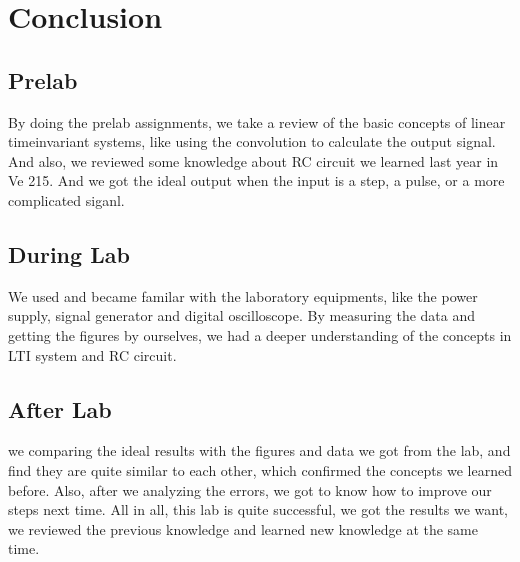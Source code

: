 \documentclass[12pt]{article}
\begin{document}
\section{Conclusion}
\subsection{Prelab}
By doing the prelab assignments, we take a review of the basic concepts of linear timeinvariant systems, like using the convolution to calculate the output signal. And also, we reviewed some knowledge about RC circuit we learned last year in Ve 215. And we got the ideal output when the input is a step, a pulse, or a more complicated siganl.
\subsection{During Lab}
We used and became familar with the laboratory equipments, like the power supply, signal generator and digital oscilloscope. By measuring the data and getting the figures by ourselves, we had a deeper understanding of the concepts in LTI system and RC circuit.
\subsection{After Lab}
we comparing the ideal results with the figures and data we got from the lab, and find they are quite similar to each other, which confirmed the concepts we learned before. Also, after we analyzing the errors, we got to know how to improve our steps next time.
All in all, this lab is quite successful, we got the results we want, we reviewed the previous knowledge and learned new knowledge at the same time.
\end{document}
